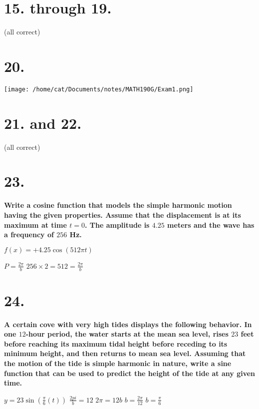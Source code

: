 \documentclass{article}%
\begin{document}
\section*{15. through 19.}
\begin{small}
(all correct)
\end{small}

\section*{20.}


\texttt{[image: /home/cat/Documents/notes/MATH190G/Exam1.png]}
\section*{21. and 22.}
\begin{small}
(all correct)
\end{small}
\clearpage
\section*{23.}
\textbf{Write a cosine function that models the simple harmonic motion having the given properties. Assume that the displacement is at its maximum at time $t = 0$. The amplitude is $4.25$ meters and the wave has a frequency of $256$ Hz. \newline}

\begin{center}
$f(x) = +4.25\cos (512\pi t)$\newline

$P=\frac{2\pi}{b}$\newline
$256\times 2 = 512 = \frac{2\pi}{b}$\newline
\end{center}



\section*{24.}
\textbf{A certain cove with very high tides displays the following behavior. In one $12$-hour period, the water starts at the mean sea level, rises $23$ feet before reaching its maximum tidal height before receding to its minimum height, and then returns to mean sea level. Assuming that the motion of the tide is simple harmonic in nature, write a sine function that can be used to predict the height of the tide at any given time. \newline}
\begin{center}
$y = 23\sin(\frac{\pi}{6}(t))$ \newline \newline
$\frac{2pi}{b} = 12$\newline
$2\pi = 12b$\newline
$b = \frac{2\pi}{12}$\newline
$b = \frac{\pi}{6}$\newline
\end{center}
\end{document}
